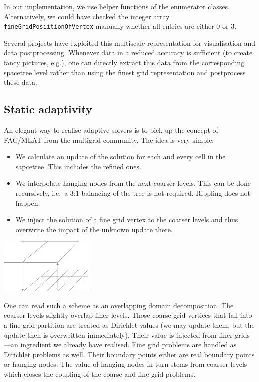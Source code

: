 \noindent
In our implementation, we use helper functions of the enumerator classes. 
Alternatively, we could have checked the integer array
\texttt{fineGridPosiitionOfVertex} manually whether all entries are either 0 or
3.


\begin{remark}
Several projects have exploited this multiscale representation for visualisation
and data postprocessing. Whenever data in a reduced accuracy is sufficient (to
create fancy pictures, e.g.), one can directly extract this data from the
corresponding spacetree level rather than using the finest grid representation
and postprocess these data.
\end{remark}

\subsection{Static adaptivity}

An elegant way to realise adaptive solvers is to pick up the concept of FAC/MLAT
from the multigrid community.
The idea is very simple:
\begin{itemize}
  \item We calculate an update of the solution for each and every cell in the
  sapcetree. This includes the refined ones.
  \item We interpolate hanging nodes from the next coarser levels. This can be
  done recursively, i.e.~a 3:1 balancing of the tree is not required. Rippling
  does not happen.
  \item We inject the solution of a fine grid vertex to the coarser levels and
  thus overwrite the impact of the unknown update there. 
\end{itemize}

\begin{center}
 \includegraphics[width=0.34\textwidth]{41_heat-equation/FAC.pdf}
\end{center}


\noindent
One can read such a scheme as an overlapping domain decomposition: 
The coarser levels slightly overlap finer levels. 
Those coarse grid vertices that fall into a fine grid partition are treated as
Dirichlet values (we may update them, but the update then is overwritten
immediately).
Their value is injected from finer grids---an ingredient we already have
realised.
Fine grid problems are handled as Dirichlet problems as well. 
Their boundary points either are real boundary points or hanging nodes.
The value of hanging nodes in turn stems from coarser levels which closes the
coupling of the coarse and fine grid problems.


